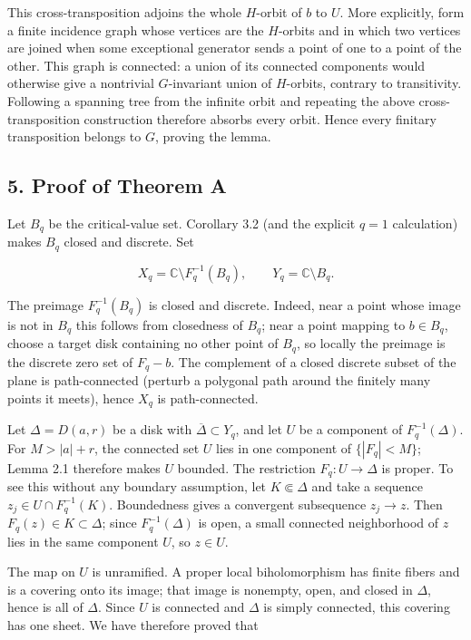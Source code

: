 \documentclass[11pt]{article}
\theoremstyle{keio}
\theoremstyle{definition}
\theoremstyle{remark}
\begin{document}
This cross-transposition adjoins the whole \(H\)-orbit of \(b\) to \(U\).
More explicitly, form a finite incidence graph whose vertices are the
\(H\)-orbits and in which two vertices are joined when some exceptional
generator sends a point of one to a point of the other. This graph is
connected: a union of its connected components would otherwise give a
nontrivial \(G\)-invariant union of \(H\)-orbits, contrary to transitivity.
Following a spanning tree from the infinite orbit and repeating the above
cross-transposition construction therefore absorbs every orbit. Hence every
finitary transposition belongs to \(G\), proving the lemma.

\subsection{5. Proof of Theorem A}

Let \(B_q\) be the critical-value set. Corollary 3.2 (and the explicit
\(q=1\) calculation) makes \(B_q\) closed and discrete. Set

\[
 X_q=\mathbb C\setminus F_q^{-1}(B_q),\qquad
 Y_q=\mathbb C\setminus B_q.
\]

The preimage \(F_q^{-1}(B_q)\) is closed and discrete. Indeed, near a point
whose image is not in \(B_q\) this follows from closedness of \(B_q\); near
a point mapping to \(b\in B_q\), choose a target disk containing no other
point of \(B_q\), so locally the preimage is the discrete zero set of
\(F_q-b\). The complement of a closed discrete subset of the plane is
path-connected (perturb a polygonal path around the finitely many points it
meets), hence \(X_q\) is path-connected.

Let \(\Delta=D(a,r)\) be a disk with \(\overline\Delta\subset Y_q\), and
let \(U\) be a component of \(F_q^{-1}(\Delta)\). For
\(M>|a|+r\), the connected set \(U\) lies in one component of
\(\{|F_q|<M\}\); Lemma 2.1 therefore makes \(U\) bounded. The restriction
\(F_q:U\to\Delta\) is proper. To see this without any boundary
assumption, let \(K\Subset\Delta\) and take a sequence
\(z_j\in U\cap F_q^{-1}(K)\). Boundedness gives a convergent subsequence
\(z_j\to z\). Then \(F_q(z)\in K\subset\Delta\); since
\(F_q^{-1}(\Delta)\) is open, a small connected neighborhood of \(z\) lies
in the same component \(U\), so \(z\in U\).

The map on \(U\) is unramified. A proper local biholomorphism has finite
fibers and is a covering onto its image; that image is nonempty, open, and
closed in \(\Delta\), hence is all of \(\Delta\). Since \(U\) is connected
and \(\Delta\) is simply connected, this covering has one sheet. We have
therefore proved that
\end{document}
